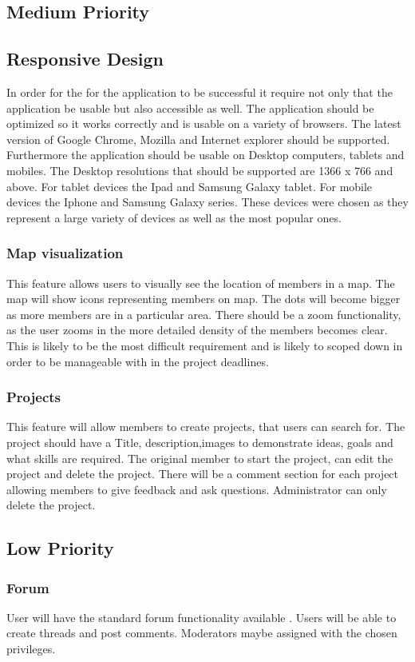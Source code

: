 \documentclass[a4paper,oneside,11pt]{report}
\begin{document}
\subsection{Medium Priority}
\subsection{Responsive Design}
In order for the for the application to be successful it require not only that the application be usable but also accessible as well. The application should be optimized so it works correctly and is usable on a variety of browsers. The latest version of Google Chrome, Mozilla and Internet explorer should be supported. Furthermore the application should be usable on Desktop computers, tablets and mobiles. The Desktop resolutions that should be supported are 1366 x 766 and above. For tablet devices the Ipad and Samsung Galaxy tablet. For mobile devices the Iphone and Samsung Galaxy series. These devices were chosen as they represent a large variety of devices as well as the most popular ones.

\subsubsection{Map visualization}
This feature allows users to visually see the location of members in a map. The map will show icons representing members on map. The dots will become bigger as more members are in a particular area. There should be a zoom functionality, as the user zooms in the more detailed density of the members becomes clear. This is likely to be the most difficult requirement and is likely to scoped down in order to be manageable with in the project deadlines.
\subsubsection{Projects}
This feature will allow members to create projects, that users can search for. The project should have a Title, description,images to demonstrate ideas, goals and what skills are required. The original member to start the project, can edit the project and delete the project. There will be a comment section for each project allowing members to give feedback and ask questions. Administrator can only delete the project.
\subsection{Low Priority}
\subsubsection{Forum}
User will have the standard forum functionality available . Users will be able to create threads and post comments. Moderators maybe assigned with the chosen privileges. 
\pagebreak
\end{document}
